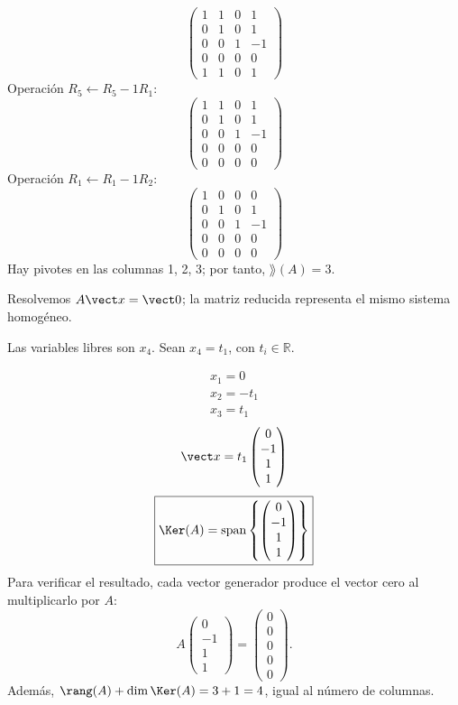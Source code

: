 \[
\begin{pmatrix}1&1&0&1\\0&1&0&1\\0&0&1&-1\\0&0&0&0\\1&1&0&1\end{pmatrix}
\]
Operación $R_{5}\leftarrow R_{5}-1R_{1}$:
\[
\begin{pmatrix}1&1&0&1\\0&1&0&1\\0&0&1&-1\\0&0&0&0\\0&0&0&0\end{pmatrix}
\]
Operación $R_{1}\leftarrow R_{1}-1R_{2}$:
\[
\begin{pmatrix}1&0&0&0\\0&1&0&1\\0&0&1&-1\\0&0&0&0\\0&0&0&0\end{pmatrix}
\]
Hay pivotes en las columnas 1, 2, 3; por tanto, $\boxed{\rang(A)=3}$.

Resolvemos $A\vect x=\vect0$; la matriz reducida representa el mismo sistema homogéneo.

Las variables libres son $x_{4}$. Sean $x_{4}=t_{1}$, con $t_i\in\mathbb R$.

\[
\begin{aligned}x_{1}=0\\x_{2}=- t_{1}\\x_{3}=t_{1}\end{aligned}
\]
\[
\vect x=t_{1}\begin{pmatrix}0\\-1\\1\\1\end{pmatrix}
\]
\[
\boxed{\Ker(A)=\operatorname{span}\left\{\begin{pmatrix}0\\-1\\1\\1\end{pmatrix}\right\}}
\]
Para verificar el resultado, cada vector generador produce el vector cero al multiplicarlo por $A$:
\[
A\begin{pmatrix}0\\-1\\1\\1\end{pmatrix}=\begin{pmatrix}0\\0\\0\\0\\0\end{pmatrix}.
\]
Además, $\rang(A)+\dim\Ker(A)=3+1=4$, igual al número de columnas.


